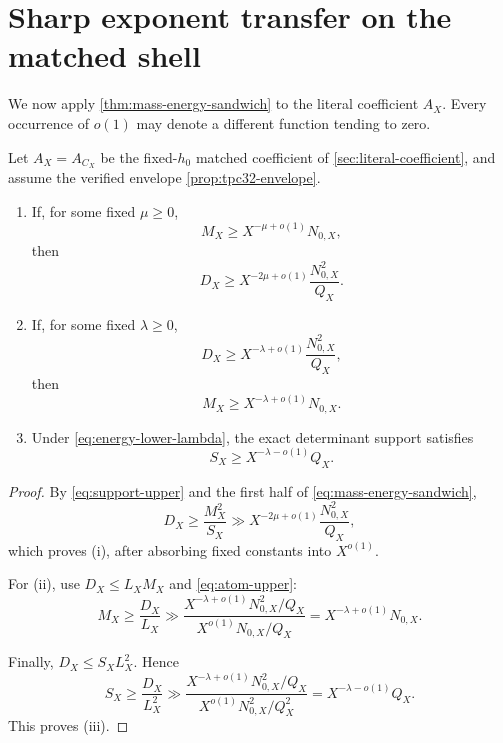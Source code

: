 \section{Sharp exponent transfer on the matched shell}
\label{sec:exponent-transfer}

We now apply \cref{thm:mass-energy-sandwich} to the literal
coefficient \(A_X\).  Every occurrence of \(o(1)\) may denote a
different function tending to zero.

\begin{theorem}
\label{thm:two-sided-transfer}
Let \(A_X=A_{C_X}\) be the fixed-\(h_0\) matched coefficient of
\cref{sec:literal-coefficient}, and assume the verified envelope
\cref{prop:tpc32-envelope}.

\begin{enumerate}[label=(\roman*),leftmargin=2.2em]
\item If, for some fixed \(\mu\ge0\),
\begin{equation}
 M_X\ge X^{-\mu+o(1)}N_{0,X},
\label{eq:mass-lower-mu}
\end{equation}
then
\begin{equation}
\boxed{
 D_X\ge
 X^{-2\mu+o(1)}
 \frac{N_{0,X}^2}{Q_X}.}
\label{eq:energy-from-mass}
\end{equation}

\item If, for some fixed \(\lambda\ge0\),
\begin{equation}
 D_X\ge
 X^{-\lambda+o(1)}
 \frac{N_{0,X}^2}{Q_X},
\label{eq:energy-lower-lambda}
\end{equation}
then
\begin{equation}
\boxed{
 M_X\ge
 X^{-\lambda+o(1)}N_{0,X}.}
\label{eq:mass-from-energy}
\end{equation}

\item Under \eqref{eq:energy-lower-lambda}, the exact determinant
support satisfies
\begin{equation}
\boxed{
 S_X\ge X^{-\lambda-o(1)}Q_X.}
\label{eq:support-from-energy}
\end{equation}
\end{enumerate}
\end{theorem}

\begin{proof}
By \eqref{eq:support-upper} and the first half of
\eqref{eq:mass-energy-sandwich},
\[
 D_X\ge\frac{M_X^2}{S_X}
 \gg
 X^{-2\mu+o(1)}
 \frac{N_{0,X}^2}{Q_X},
\]
which proves (i), after absorbing fixed constants into \(X^{o(1)}\).

For (ii), use \(D_X\le L_XM_X\) and
\eqref{eq:atom-upper}:
\[
 M_X
 \ge\frac{D_X}{L_X}
 \gg
 \frac{
 X^{-\lambda+o(1)}N_{0,X}^2/Q_X
 }{
 X^{o(1)}N_{0,X}/Q_X
 }
 =
 X^{-\lambda+o(1)}N_{0,X}.
\]

Finally, \(D_X\le S_XL_X^2\).  Hence
\[
 S_X
 \ge\frac{D_X}{L_X^2}
 \gg
 \frac{
 X^{-\lambda+o(1)}N_{0,X}^2/Q_X
 }{
 X^{o(1)}N_{0,X}^2/Q_X^2
 }
 =
 X^{-\lambda-o(1)}Q_X.
\]
This proves (iii).
\end{proof}

